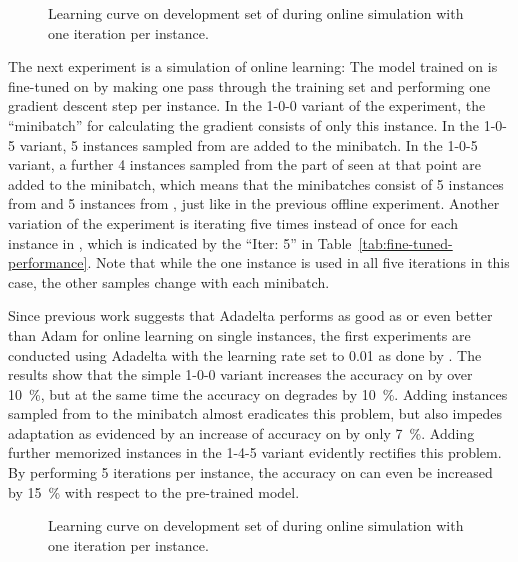 \begin{figure}[h]
  \centering
  \resizebox{\textwidth}{!}{}
  \caption{Learning curve on development set of \nlmapsfour{} during online
    simulation with one iteration per instance.}
  \label{fig:online-1-v4-learning-curve}
\end{figure}

The next experiment is a simulation of online learning: The model trained on
\nlmapsthree{} is fine-tuned on \nlmapsfour{} by making one pass through the
\nlmfour{} training set and performing one gradient descent step per instance.
In the 1-0-0 variant of the experiment, the \enquote{minibatch} for calculating
the gradient consists of only this instance. In the 1-0-5 variant, 5 instances
sampled from \nlmapsthree{} are added to the minibatch. In the 1-0-5 variant, a
further 4 instances sampled from the part of \nlmfour{} seen at that point are
added to the minibatch, which means that the minibatches consist of 5 instances
from \nlmthree{} and 5 instances from \nlmfour{}, just like in the previous
offline experiment. Another variation of the experiment is iterating five times
instead of once for each instance in \nlmfour{}, which is indicated by the
\enquote{Iter: 5} in Table~\ref{tab:fine-tuned-performance}. Note that while the
one instance is used in all five iterations in this case, the other samples
change with each minibatch.

Since previous work suggests that Adadelta performs as good as
\parencite{peris-2017} or even better than \parencites{turchi-2017}{peris-2019}
Adam for online learning on single instances, the first experiments are
conducted using Adadelta with the learning rate set to \num{0.01} as done by
\textcite{peris-2019}. The results show that the simple 1-0-0 variant increases
the accuracy on \nlmfour{} by over \SI{10}{\%}, but at the same time the
accuracy on \nlmthree{} degrades by \SI{10}{\%}. Adding instances sampled from
\nlmthree{} to the minibatch almost eradicates this problem, but also impedes
adaptation as evidenced by an increase of accuracy on \nlmfour{} by only
\SI{7}{\%}. Adding further memorized \nlmfour{} instances in the 1-4-5 variant
evidently rectifies this problem. By performing 5 iterations per instance, the
accuracy on \nlmfour{} can even be increased by \SI{15}{\%} with respect to the
pre-trained model.

\begin{figure}[h]
  \centering
  \resizebox{\textwidth}{!}{}
  \caption{Learning curve on development set of \nlmapsthree{} during online
    simulation with one iteration per instance.}
  \label{fig:online-1-v3-learning-curve}
\end{figure}

